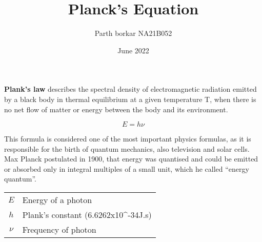\documentclass{article}
\title{\textbf{Planck’s Equation}}
\date{June 2022}
\author{Parth borkar NA21B052}
\begin{document}
  \maketitle
\large
\paragraph{} \textbf{Plank's law} describes the spectral density of electromagnetic radiation emitted by a black body in thermal equilibrium at a given temperature T, when there is no net flow of matter or energy between the body and its environment.

\vspace{1cm}


\boldmath
\begin{equation}
  E=h\nu
\end{equation}

\vspace{1cm}

This formula is considered one of the most important physics formulas, as it is responsible for the birth of quantum mechanics, also television and solar cells.  Max Planck postulated in 1900, that energy was quantised and could be emitted or absorbed only in integral multiples of a small unit, which he called “energy quantum”.
\vspace{1cm}

\begin{tabular}{|c|l|}
    \hline
    $E$ & Energy of a photon\\
    $h$ & Plank's constant (6.6262x10^{-34}J.s)\\
    $\nu$ & Frequency of photon\\
    \hline
\end{tabular}
\end{document}
